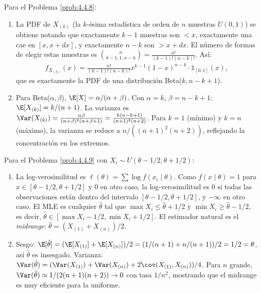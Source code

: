 \begin{solucion}
	\label{sol:4.4.8}
	Para el Problema \ref{prob:4.4.8}:
	\begin{enumerate}
		\item La PDF de $X_{(k)}$ (la $k$-ésima estadística de orden de $n$ muestras $U(0,1)$) se obtiene notando que exactamente $k-1$ muestras son $< x$, exactamente una cae en $[x, x+dx]$, y exactamente $n-k$ son $> x+dx$. El número de formas de elegir estas muestras es $\binom{n}{k-1, 1, n-k} = \frac{n!}{(k-1)!(n-k)!}$. Así:
		\begin{align*}
			f_{X_{(k)}}(x) = \frac{n!}{(k-1)!(n-k)!} x^{k-1}(1-x)^{n-k} \cdot \mathbb{1}_{[0,1]}(x),
		\end{align*}
		que es exactamente la PDF de una distribución Beta($k, n-k+1$).
		\item Para Beta($\alpha, \beta$), $\E[X] = \alpha/(\alpha+\beta)$. Con $\alpha = k$, $\beta = n-k+1$: $\E[X_{(k)}] = k/(n+1)$. La varianza es $\Var(X_{(k)}) = \frac{\alpha\beta}{(\alpha+\beta)^{2}(\alpha+\beta+1)} = \frac{k(n-k+1)}{(n+1)^{2}(n+2)}$. Para $k=1$ (mínimo) y $k=n$ (máximo), la varianza se reduce a $n/((n+1)^{2}(n+2))$, reflejando la concentración en los extremos.
	\end{enumerate}
\end{solucion}

\begin{solucion}
	\label{sol:4.4.9}
	Para el Problema \ref{prob:4.4.9} con $X_{i} \sim U(\theta - 1/2, \theta + 1/2)$:
	\begin{enumerate}
		\item La log-verosimilitud es $\ell(\theta) = \sum \log f(x_i \mid \theta)$. Como $f(x \mid \theta) = 1$ para $x \in [\theta - 1/2, \theta + 1/2]$ y $0$ en otro caso, la log-verosimilitud es $0$ si todas las observaciones están dentro del intervalo $[\theta - 1/2, \theta + 1/2]$, y $-\infty$ en otro caso. El MLE es cualquier $\hat{\theta}$ tal que $\max X_i \le \hat{\theta} + 1/2$ y $\min X_i \ge \hat{\theta} - 1/2$, es decir, $\hat{\theta} \in [\max X_i - 1/2, \min X_i + 1/2]$. El estimador natural es el \emph{midrange}: $\hat{\theta} = (X_{(1)} + X_{(n)})/2$.
		\item Sesgo: $\E[\hat{\theta}] = (\E[X_{(1)}] + \E[X_{(n)}])/2 = (1/(n+1) + n/(n+1))/2 = 1/2 = \theta$, así $\hat{\theta}$ es insesgado. Varianza: $\Var(\hat{\theta}) = (\Var(X_{(1)}) + \Var(X_{(n)}) + 2\cov(X_{(1)}, X_{(n)}))/4$. Para $n$ grande, $\Var(\hat{\theta}) \approx 1/(2(n+1)(n+2)) \to 0$ con tasa $1/n^{2}$, mostrando que el midrange es muy eficiente para la uniforme.
	\end{enumerate}
\end{solucion}

